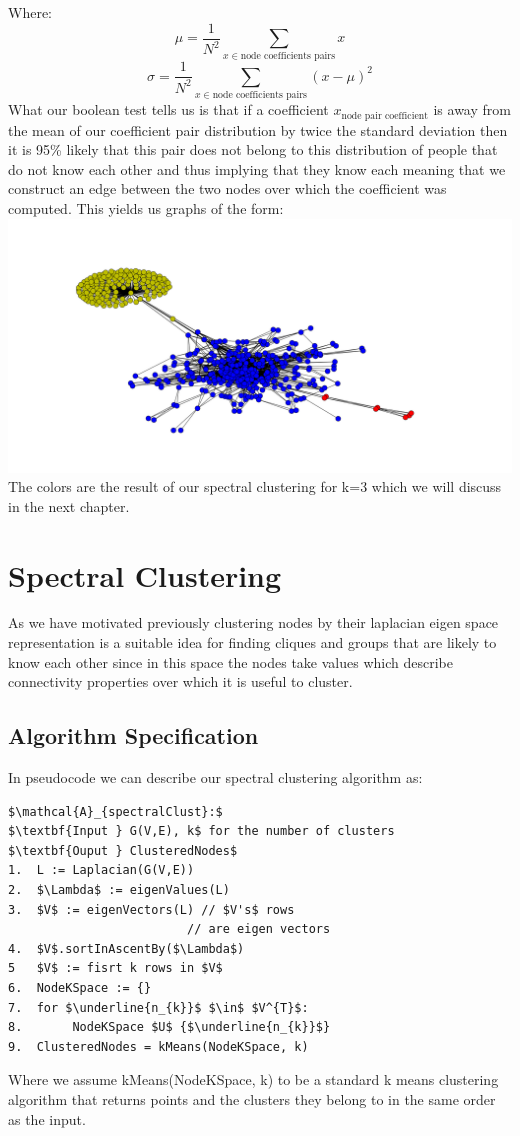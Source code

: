 \documentclass[10pt,twocolumn]{article}
\begin{document}
Where: $$\mu = \frac{1}{N^{2}}\sum_{x \in \text{node coefficients pairs} } x$$  $$\sigma = \frac{1}{N^{2}}\sum_{x \in \text{node coefficients pairs} } (x- \mu)^{2}$$
What our boolean test tells us is that if a coefficient $x_{\text{node pair coefficient}}$ is away from the mean of our coefficient pair distribution by twice the standard deviation then it is 95\%  likely that this pair does not belong to this distribution of people that do not know each other and thus implying that they know each meaning that we construct an edge between the two nodes over which the coefficient was computed. This yields us graphs of the form:
\hspace*{-2cm}
\includegraphics[scale=0.2]{pics/spring.png}
The colors are the result of our spectral clustering
for k=3 which we will discuss in the next chapter.
\section{Spectral Clustering}
As we have motivated previously clustering nodes by their laplacian eigen space representation is a suitable idea for finding cliques and groups that are likely to know each other since in this space the nodes take values which describe connectivity properties over which it is useful to cluster.
\subsection{Algorithm Specification}
In pseudocode we can describe our spectral clustering algorithm as:
\begin{lstlisting}[mathescape]
$\mathcal{A}_{spectralClust}:$
$\textbf{Input } G(V,E), k$ for the number of clusters
$\textbf{Ouput } ClusteredNodes$
1.  L := Laplacian(G(V,E))
2.  $\Lambda$ := eigenValues(L)
3.  $V$ := eigenVectors(L) // $V's$ rows
                         // are eigen vectors
4.  $V$.sortInAscentBy($\Lambda$)
5   $V$ := fisrt k rows in $V$
6.  NodeKSpace := {}
7.  for $\underline{n_{k}}$ $\in$ $V^{T}$:
8.       NodeKSpace $U$ {$\underline{n_{k}}$}
9.  ClusteredNodes = kMeans(NodeKSpace, k)
\end{lstlisting}

Where we assume kMeans(NodeKSpace, k) to be a standard k means clustering algorithm that returns points and the clusters they belong to in the same order as the input. 
\end{document}
